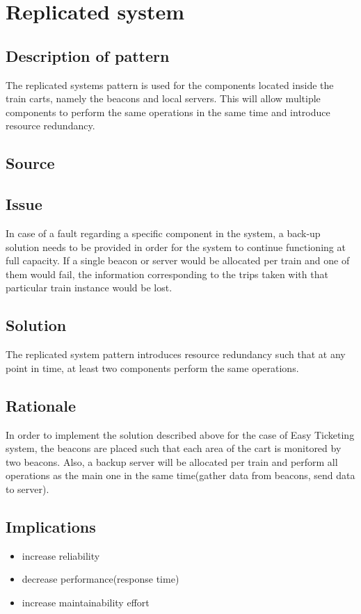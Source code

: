 
\section{Replicated system}

\subsection{Description of pattern}

The replicated systems pattern is used for the components located inside the train carts, namely the beacons and local servers. This will allow multiple components to perform the same operations in the same time and introduce resource redundancy.

\subsection{Source} \cite{book:design-patterns}

\subsection{Issue} 
In case of a fault regarding a specific component in the system, a back-up solution needs to be provided in order for the system to continue functioning at full capacity. If a single beacon or server would be allocated per train and one of them would fail, the information corresponding to the trips taken with that particular train instance would be lost.

\subsection{Solution}
The replicated system pattern introduces resource redundancy such that at any point in time, at least two components perform the same operations.

\subsection{Rationale}
In order to implement the solution described above for the case of Easy Ticketing system, the beacons are placed such that each area of the cart is monitored by two beacons. Also, a backup server will be allocated per train and perform all operations as the main one in the same time(gather data from beacons, send data to server).


\subsection{Implications}
\begin{itemize}
	\item increase reliability
	\item decrease performance(response time)
	\item increase maintainability effort
\end{itemize}

